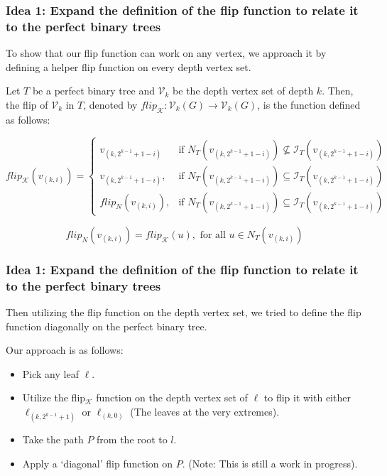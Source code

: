 \documentclass[10pt,]{beamer}
\theoremstyle{conjectureStyle}
\theoremstyle{notationStyle}
\begin{document}
\begin{frame}\frametitle{Idea 1: Expand the definition of the flip function to relate it to the perfect binary trees}
    To show that our flip function can work on any vertex, we approach it by defining a helper flip function on every depth vertex set.

    \begin{definition}
        Let $T$ be a perfect binary tree and $\mathcal{V}_k$ be the depth vertex set of depth $k$. Then, the flip of $\mathcal{V}_k$ in $T$, denoted by $flip_\mathcal{K}: \mathcal{V}_k(G) \rightarrow \mathcal{V}_k(G)$, is the function defined as follows:

        \begin{equation*}
            flip_\mathcal{K}(v_{(k, i)}) = \begin{cases}
                v_{(k, 2^{k-1} + 1 - i)}  & \text{if } N_T(v_{(k, 2^{k - 1} + 1 - i)}) \not\subseteq \mathcal{I}_T(v_{(k, 2^{k - 1} + 1 - i)}) \\
                v_{(k, 2^{k-1} + 1 - i)}, & \text{if } N_T(v_{(k, 2^{k - 1} + 1 - i)}) \subseteq \mathcal{I}_T(v_{(k, 2^{k - 1} + 1 - i)})     \\
                flip_N(v_{(k, i)}),       & \text{if } N_T(v_{(k, 2^{k - 1} + 1 - i)}) \subseteq \mathcal{I}_T(v_{(k, 2^{k - 1} + 1 - i)})
            \end{cases}
        \end{equation*}

        \begin{equation*}
            flip_N(v_{(k, i)}) =  flip_\mathcal{K}(u), \text{ for all } u \in N_T(v_{(k, i)})
        \end{equation*}
    \end{definition}
\end{frame}


\begin{frame}\frametitle{Idea 1: Expand the definition of the flip function to relate it to the perfect binary trees}
    Then utilizing the flip function on the depth vertex set, we tried to define the flip function diagonally on the perfect binary tree.

    Our approach is as follows:

    \begin{itemize}
        \item Pick any leaf $\ell$.
        \item Utilize the flip$_\mathcal{K}$ function on the depth vertex set of $\ell$ to flip it with either $\ell_{(k, 2^{k - 1} + 1)}$ or $\ell_{(k, 0)}$ (The leaves at the very extremes).
        \item Take the path $P$ from the root to $l$.
        \item Apply a `diagonal' flip function on $P$. (Note: This is still a work in progress).
    \end{itemize}
\end{frame}
\end{document}
